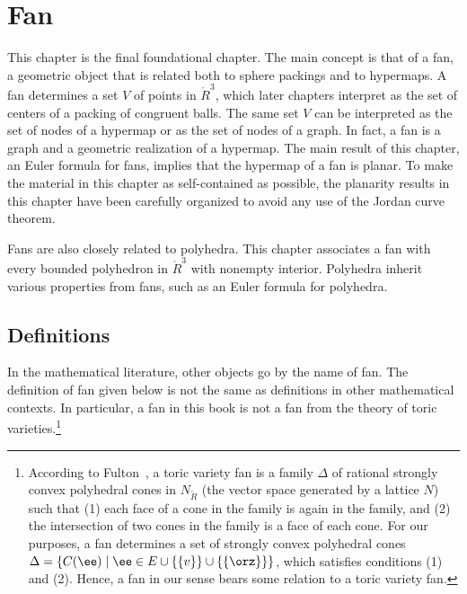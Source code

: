 \chapter{Fan}\label{sec:fan}




\begin{summary}
  This chapter is the final foundational chapter.  The main concept is
  that of a fan, a geometric object that is related both to sphere
  packings and to hypermaps.  A fan determines a set $V$ of points in
  $\ring{R}^3$, which later chapters interpret as the set of centers
  of a packing of congruent balls.  The same set $V$ can be
  interpreted as the set of nodes of a hypermap or as the set of
  nodes of a graph.  In fact, a fan is a graph and a geometric
  realization of a hypermap.  The main result of this chapter, an
  Euler formula for fans,  implies that the hypermap of a
  fan is planar.  To make the material in this chapter as self-contained
 as possible, the planarity results in this chapter have been carefully
  organized to avoid any use of the Jordan curve theorem.

  Fans are also closely related to polyhedra.  This chapter associates
  a fan with every bounded polyhedron in $\ring{R}^3$ with nonempty
  interior.  Polyhedra inherit various properties from fans, such
  as an Euler formula for polyhedra.
\end{summary}


%
%
%
%
%

\section{Definitions}



\begin{remark}
  In the mathematical literature, other objects go by
  the name of fan.  The definition of fan given below is not the same
  as definitions in other mathematical contexts.  In particular, a fan
  in this book is not a fan from the theory of toric
  varieties.\footnote{According to
    Fulton~\cite{Fulton}, %
    a toric variety fan is a family $\Delta$ of rational strongly
    convex polyhedral cones in $N_{\ring{R}}$ (the vector space
    generated by a lattice $N$) such that (1) each face of a cone in
    the family is again in the family, and (2) the intersection of two
    cones in the family is a face of each cone.  For our purposes, a
    fan determines a set of strongly convex polyhedral cones $\Delta =
    \{ C(\ee)\mid \ee\in E\cup \{ \{v \} \} \cup \{ \{ \orz\} \} \}$,
    which satisfies conditions (1) and (2).  Hence, a fan in our sense
    bears some relation to a toric variety fan.}
\end{remark}
%

